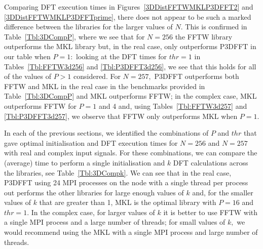 \documentclass[a4paper]{article}
\begin{document}
 Comparing DFT execution times in Figures~\ref{3DDistFFTWMKLP3DFFT2}
 and \ref{3DDistFFTWMKLP3DFFTprime}, there does not appear to be such
 a marked difference between the libraries for the larger values of
 $N.$ This is confirmed in Table~\ref{Tbl:3DCompP}, where we see that
 for $N=256$ the FFTW library outperforms the MKL library but, in the
 real case, only outperforms P3DFFT in our table when $P=1:$ looking
 at the DFT times for $thr=1$ in Tables~\ref{Tbl:FFTW3d256} and
 \ref{Tbl:P3DFFT3d256}, we see that this holds for all of the values
 of $P>1$ considered. For $N=257,$ P3DFFT outperforms both FFTW and
 MKL in the real case in the benchmarks provided in
 Table~\ref{Tbl:3DCompP} and MKL outperforms FFTW; in the complex
 case, MKL outperforms FFTW for $P=1$ and 4 and, using
 Tables~\ref{Tbl:FFTW3d257} and \ref{Tbl:P3DFFT3d257}, we observe that
 FFTW only outperforms MKL when $P=1.$

 In each of the previous sections, we identified the combinations of
 $P$ and $thr$ that gave optimal initialisation and DFT execution
 times for $N=256$ and $N=257$ with real and complex input
 signals. For these combinations, we can compare the (average) time to
 perform a single initialisation and $k$ DFT calculations across the
 libraries, see Table~\ref{Tbl:3DCompk}. We can see that in the real
 case, P3DFFT using 24 MPI processes on the node with a single thread
 per process out performs the other libraries for large enough values
 of $k$ and, for the smaller values of $k$ that are greater than 1,
 MKL is the optimal library with $P=16$ and $thr=1.$ In the complex
 case, for larger values of $k$ it is better to use FFTW with a single
 MPI process and a large number of threads; for small values of $k,$
 we would recommend using the MKL with a single MPI process and large
 number of threads. 
\end{document}

